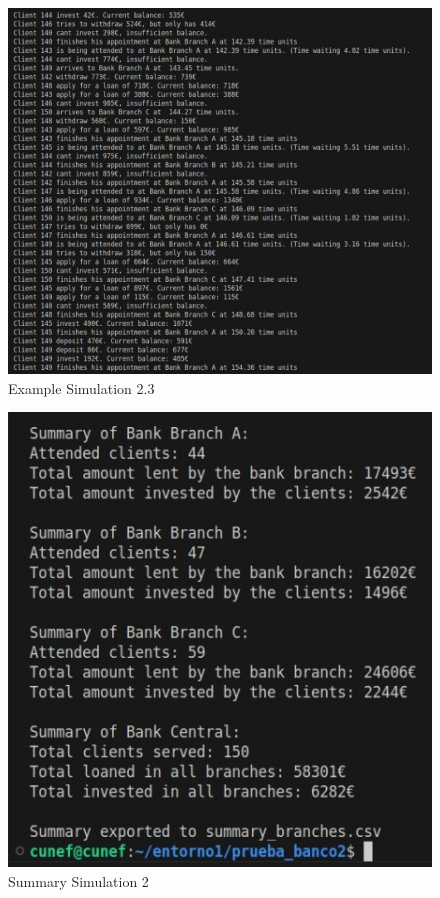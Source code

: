 \documentclass[titlepage, 12pt]{article}
\begin{document}
\begin{figure} [h]
    \centering
    \includegraphics[scale=0.6]{Screenshots/Example Simulation 2.3.jpeg}
    \caption{Example Simulation 2.3}
    \label{fig:Example Simulation 2.3}
\end{figure}

\begin{figure} [h]
    \centering
    \includegraphics[scale=1]{Screenshots/Summary Simulation 2.jpeg}
    \caption{Summary Simulation 2}
    \label{fig:Summary Simulation 2}
\end{figure}
\end{document}
